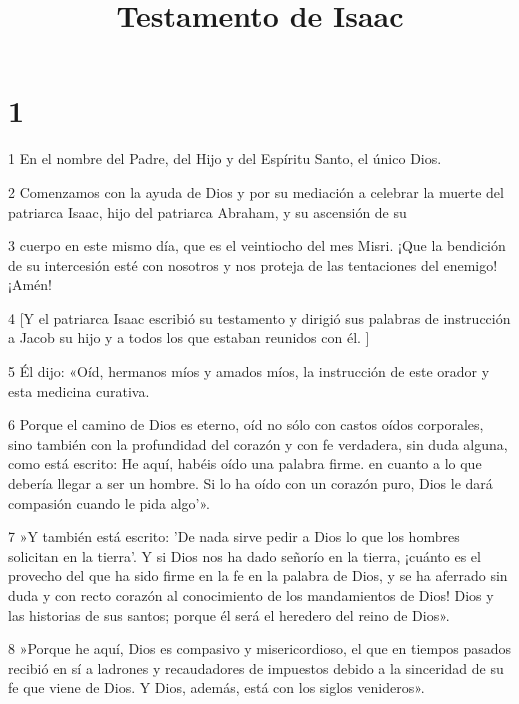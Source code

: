


\title{Testamento de Isaac}

\chapter{1}

\par 1 En el nombre del Padre, del Hijo y del Espíritu Santo, el único Dios.

\par 2 Comenzamos con la ayuda de Dios y por su mediación a celebrar la muerte del patriarca Isaac, hijo del patriarca Abraham, y su ascensión de su

\par 3 cuerpo en este mismo día, que es el veintiocho del mes Misri. ¡Que la bendición de su intercesión esté con nosotros y nos proteja de las tentaciones del enemigo! ¡Amén!

\par 4 [Y el patriarca Isaac escribió su testamento y dirigió sus palabras de instrucción a Jacob su hijo y a todos los que estaban reunidos con él. ]

\par 5 Él dijo: «Oíd, hermanos míos y amados míos, la instrucción de este orador y esta medicina curativa.

\par 6 Porque el camino de Dios es eterno, oíd no sólo con castos oídos corporales, sino también con la profundidad del corazón y con fe verdadera, sin duda alguna, como está escrito: He aquí, habéis oído una palabra firme. en cuanto a lo que debería llegar a ser un hombre. Si lo ha oído con un corazón puro, Dios le dará compasión cuando le pida algo'».

\par 7 »Y también está escrito: 'De nada sirve pedir a Dios lo que los hombres solicitan en la tierra'. Y si Dios nos ha dado señorío en la tierra, ¡cuánto es el provecho del que ha sido firme en la fe en la palabra de Dios, y se ha aferrado sin duda y con recto corazón al conocimiento de los mandamientos de Dios! Dios y las historias de sus santos; porque él será el heredero del reino de Dios».

\par 8 »Porque he aquí, Dios es compasivo y misericordioso, el que en tiempos pasados ​​recibió en sí a ladrones y recaudadores de impuestos debido a la sinceridad de su fe que viene de Dios. Y Dios, además, está con los siglos venideros».

